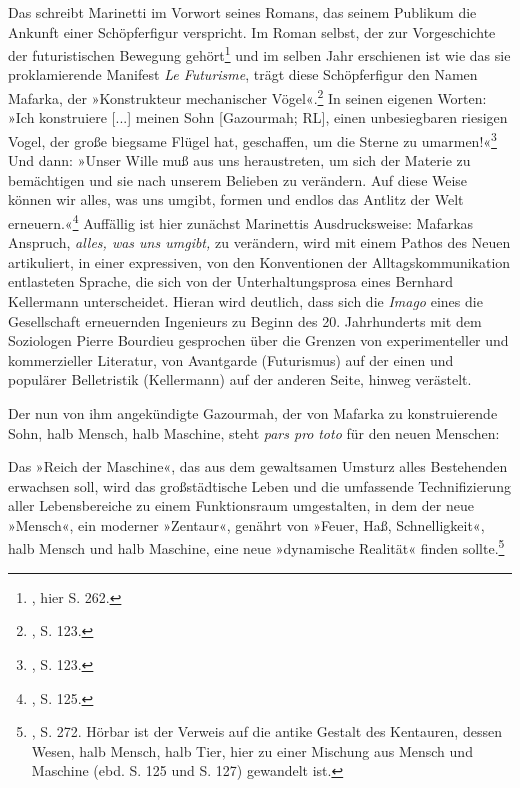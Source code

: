 \documentclass[%
	fontsize=10pt,%
	twoside,%
	headings=optiontoheadandtoc,%
	showtrims]{scrbook}
\renewenvironment{quote}{%
  \addmargin[\genericindent]{0pt}%
  \KOMAoptions{parskip=true}%
  \ifdim\parskip>0pt\else\addvspace{\intextsep}\fi
}{%
  \par
  \endaddmargin\vspace{\intextsep}
}
\begin{document}
\par Das schreibt Marinetti im Vorwort seines Romans, das seinem Publikum die Ankunft einer Schöpferfigur verspricht. Im Roman selbst, der zur Vorgeschichte der futuristischen Bewegung gehört\footnote{\cite[][]{schmidt-bergmann2004a}, hier S. 262.}  und im selben Jahr erschienen ist wie das sie proklamierende Manifest \emph{Le Futurisme}, trägt diese Schöpferfigur den Namen Mafarka, der »Konstrukteur mechanischer Vögel«.\footnote{\cite[][]{marinetti2004a}, S. 123.}  In seinen eigenen Wor\-ten: »Ich konstruiere {[}...{]} meinen Sohn {[}Gazourmah; RL{]}, einen unbesiegbaren riesigen Vogel, der große biegsame Flügel hat, geschaffen, um die Sterne zu umarmen!«\footnote{\cite[][]{marinetti2004a}, S. 123.}  Und dann: »Unser Wille muß aus uns heraustreten, um sich der Materie zu bemächtigen und sie nach unserem Belieben zu verändern. Auf diese Weise können wir alles, was uns umgibt, formen und endlos das Antlitz der Welt erneuern.«\footnote{\cite[][]{marinetti2004a}, S. 125.}  Auffällig ist hier zunächst Marinettis Ausdrucksweise: Mafarkas Anspruch, \emph{alles, was uns umgibt,} zu verändern, wird mit einem Pathos des Neuen artikuliert, in einer expressiven, von den Konventionen der Alltagskommunikation entlasteten Sprache, die sich von der Unterhaltungsprosa eines Bernhard Kellermann unterscheidet. Hieran wird deutlich, dass sich die \emph{Imago} eines die Gesellschaft erneuernden Ingenieurs zu Beginn des 20. Jahrhunderts \textendash{} mit dem Soziologen Pierre Bourdieu gesprochen \textendash{} über die Grenzen von experimenteller und kommerzieller Literatur, von Avantgarde (Futurismus) auf der einen und populärer Belletristik (Kellermann) auf der anderen Seite, hinweg verästelt.\par Der nun von ihm angekündigte Gazourmah, der von Mafarka zu konstruierende Sohn, halb Mensch, halb Maschine, steht \emph{pars pro} \emph{toto} für den neuen Menschen:\begin{quote}
\par Das »Reich der Maschine«, das aus dem gewaltsamen Umsturz alles Bestehenden erwachsen soll, wird das großstädtische Leben und die umfassende Technifizierung aller Lebensbereiche zu einem Funktionsraum umgestalten, in dem der neue »Mensch«, ein moderner »Zentaur«, genährt von »Feuer, Haß, Schnelligkeit«, halb Mensch und halb Maschine, eine neue »dynamische Realität« finden sollte.\footnote{\cite[][]{marinetti2004a}, S. 272. Hörbar ist der Verweis auf die antike Gestalt des Kentauren, dessen Wesen, halb Mensch, halb Tier, hier zu einer Mischung aus Mensch und Maschine (ebd. S. 125 und S. 127) gewandelt ist.} 
\end{quote}
\end{document}
